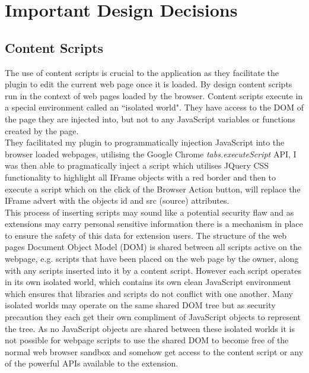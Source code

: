 \documentclass[12pt]{article}
\begin{document}
\section{Important Design Decisions}

\subsection{Content Scripts}
The use of content scripts is crucial to the application as they facilitate the plugin to edit the current web page once it is loaded. By design content scripts run in the context of web pages loaded by the browser. Content scripts execute in a special environment called an ``isolated world". They have access to the DOM of the page they are injected into, but not to any JavaScript variables or functions created by the page. \\ 

They facilitated my plugin to programmatically injection JavaScript into the browser loaded webpages, utilising the Google Chrome \textit{tabs.executeScript} API, I was then able to pragmatically inject a script which utilises JQuery CSS functionality to highlight all IFrame objects with a red border and then to execute a script which on the click of the Browser Action button, will replace the IFrame advert with the objects id and src (source) attributes.  \\

This process of inserting scripts may sound like a potential security flaw and as extensions may carry personal sensitive information there is a mechanism in place to ensure the safety of this data for extension users. The structure of the web pages Document Object Model (DOM) is shared between all scripts active on the webpage, e.g. scripts that have been placed on the web page by the owner, along with any scripts inserted into it by a content script. However each script operates in its own isolated world, which contains its own clean JavaScript environment which ensures that libraries and scripts do not conflict with one another. Many isolated worlds may operate on the same shared DOM tree but as security precaution they each get their own compliment of JavaScript objects to represent the tree. As no JavaScript objects are shared between these isolated worlds it is not possible for webpage scripts to use the shared DOM to become free of the normal web browser sandbox and somehow get access to the content script or any of the powerful APIs available to the extension. 
\end{document}
